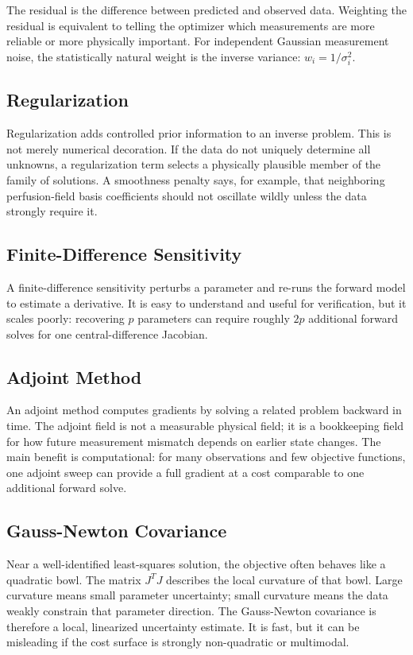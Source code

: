\documentclass[11pt]{article}
\numberwithin{equation}{section}
\begin{document}
The residual is the difference between predicted and observed data.  Weighting
the residual is equivalent to telling the optimizer which measurements are more
reliable or more physically important.  For independent Gaussian measurement
noise, the statistically natural weight is the inverse variance:
$w_i=1/\sigma_i^2$.

\subsection{Regularization}

Regularization adds controlled prior information to an inverse problem.  This
is not merely numerical decoration.  If the data do not uniquely determine all
unknowns, a regularization term selects a physically plausible member of the
family of solutions.  A smoothness penalty says, for example, that neighboring
perfusion-field basis coefficients should not oscillate wildly unless the data
strongly require it.

\subsection{Finite-Difference Sensitivity}

A finite-difference sensitivity perturbs a parameter and re-runs the forward
model to estimate a derivative.  It is easy to understand and useful for
verification, but it scales poorly: recovering $p$ parameters can require
roughly $2p$ additional forward solves for one central-difference Jacobian.

\subsection{Adjoint Method}

An adjoint method computes gradients by solving a related problem backward in
time.  The adjoint field is not a measurable physical field; it is a bookkeeping
field for how future measurement mismatch depends on earlier state changes.
The main benefit is computational: for many observations and few objective
functions, one adjoint sweep can provide a full gradient at a cost comparable
to one additional forward solve.

\subsection{Gauss-Newton Covariance}

Near a well-identified least-squares solution, the objective often behaves like
a quadratic bowl.  The matrix $J^TJ$ describes the local curvature of that bowl.
Large curvature means small parameter uncertainty; small curvature means the
data weakly constrain that parameter direction.  The Gauss-Newton covariance is
therefore a local, linearized uncertainty estimate.  It is fast, but it can be
misleading if the cost surface is strongly non-quadratic or multimodal.
\end{document}
